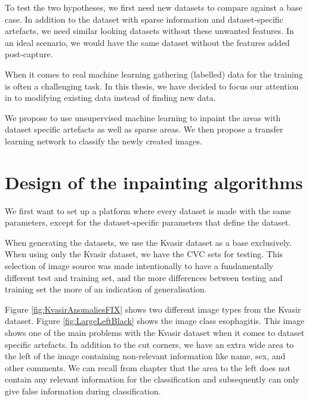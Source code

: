 To test the two hypotheses, we first need new datasets to compare against a base case. In addition to the dataset with sparse information and dataset-specific artefacts, we need similar looking datasets without these unwanted features. In an ideal scenario, we would have the same dataset without the features added post-capture. 

When it comes to real machine learning gathering (labelled) data for the training is often a challenging task. In this thesis, we have decided to focus our attention in to modifying existing data instead of finding new data. 

We propose to use unsupervised machine learning to inpaint the areas with dataset specific artefacts as well as sparse areas. We then propose a transfer learning network to classify the newly created images. 



\section{Design of the inpainting algorithms}
We first want to set up a platform where every dataset is made with the same parameters, except for the dataset-specific parameters that define the dataset. 

When generating the datasets, we use the Kvasir dataset as a base exclusively. When using only the Kvasir dataset, we have the CVC sets for testing. This selection of image source was made intentionally to have a fundamentally different test and training set, and the more differences between testing and training set the more of an indication of generalisation. 


Figure \ref{fig:KvasirAnomaliesFIX} shows two different image types from the Kvasir dataset. 
Figure \ref{fig:LargeLeftBlack} shows the image class esophagitis. This image shows one of the main problems with the Kvasir dataset when it comes to dataset specific artefacts. In addition to the cut corners, we have an extra wide area to the left of the image containing non-relevant information like name, sex, and other comments. We can recall from chapter  that the area to the left does not contain any relevant information for the classification and subsequently can only give false information during classification. 

